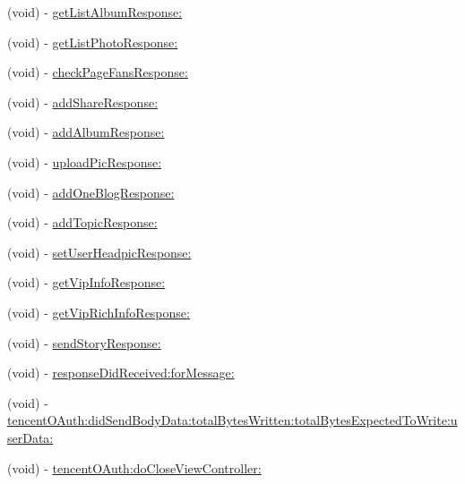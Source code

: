 \begin{DoxyCompactItemize}
(void) -\/ \mbox{\hyperlink{protocol_tencent_session_delegate-p_a51e1be4e15865ec6c54748596fffd5df}{get\+List\+Album\+Response\+:}}
\item 
(void) -\/ \mbox{\hyperlink{protocol_tencent_session_delegate-p_a9730f3fa053bd0a0d0d6ab2ec8692671}{get\+List\+Photo\+Response\+:}}
\item 
(void) -\/ \mbox{\hyperlink{protocol_tencent_session_delegate-p_a3180b739637e48ae4c986eb98caa3307}{check\+Page\+Fans\+Response\+:}}
\item 
(void) -\/ \mbox{\hyperlink{protocol_tencent_session_delegate-p_a216d645eacd9b1e25a941ba53dc1ee02}{add\+Share\+Response\+:}}
\item 
(void) -\/ \mbox{\hyperlink{protocol_tencent_session_delegate-p_a065feaea11a1a1ec423a85859b36a0c5}{add\+Album\+Response\+:}}
\item 
(void) -\/ \mbox{\hyperlink{protocol_tencent_session_delegate-p_ae464b20ef11dd5fbed06862bcbe2f7d2}{upload\+Pic\+Response\+:}}
\item 
(void) -\/ \mbox{\hyperlink{protocol_tencent_session_delegate-p_a3ba2a0c6a9f2444218b6acef8daf30d6}{add\+One\+Blog\+Response\+:}}
\item 
(void) -\/ \mbox{\hyperlink{protocol_tencent_session_delegate-p_a708d12ee5e08e418428f834b9e7aefd6}{add\+Topic\+Response\+:}}
\item 
(void) -\/ \mbox{\hyperlink{protocol_tencent_session_delegate-p_ae487da5d4b7d86179c8f98cbceac848d}{set\+User\+Headpic\+Response\+:}}
\item 
(void) -\/ \mbox{\hyperlink{protocol_tencent_session_delegate-p_ad0d91a95626727d1dc20fb96df2d442a}{get\+Vip\+Info\+Response\+:}}
\item 
(void) -\/ \mbox{\hyperlink{protocol_tencent_session_delegate-p_aa6c9ad57c523c339220224ed84c22bf3}{get\+Vip\+Rich\+Info\+Response\+:}}
\item 
(void) -\/ \mbox{\hyperlink{protocol_tencent_session_delegate-p_ac6628547be6fc0208797fbd6a5d7830c}{send\+Story\+Response\+:}}
\item 
(void) -\/ \mbox{\hyperlink{protocol_tencent_session_delegate-p_aec2b0e15cdc45c30b0f67b708f97c44a}{response\+Did\+Received\+:for\+Message\+:}}
\item 
(void) -\/ \mbox{\hyperlink{protocol_tencent_session_delegate-p_a389127c47a6ad7efbd1ec738efd7ad02}{tencent\+O\+Auth\+:did\+Send\+Body\+Data\+:total\+Bytes\+Written\+:total\+Bytes\+Expected\+To\+Write\+:user\+Data\+:}}
\item 
(void) -\/ \mbox{\hyperlink{protocol_tencent_session_delegate-p_afb8ed4decd4a2c070ae709e08bdfcab2}{tencent\+O\+Auth\+:do\+Close\+View\+Controller\+:}}
\end{DoxyCompactItemize}


